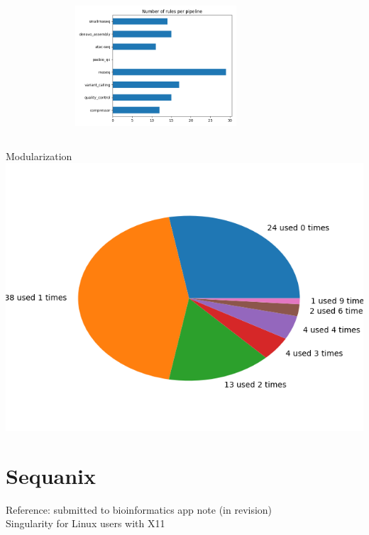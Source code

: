 \documentclass{beamer}
\begin{document}
\begin{frame}{Modularization}
\hspace{-1.8cm}
    \includegraphics[width=6cm, height=7cm]{images/number_of_rules.png}
    \includegraphics[scale=0.4]{images/rules_reusing.png}
\end{frame}


\section{Sequanix}


\begin{frame}
 
 Reference: submitted to bioinformatics app note (in revision)\\
 
 Singularity for Linux users with X11 
 
\end{frame}
\end{document}
